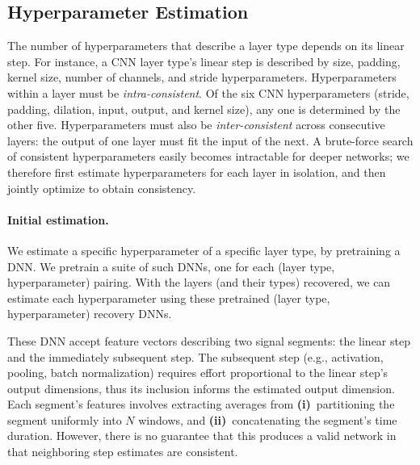 \documentclass[12pt]{report}
\newcommand{\Li}{\textbf{(i)}\ }
\newcommand{\Lii}{\textbf{(ii)}\ }
\begin{document}
\vspace{-2mm}
\subsection{Hyperparameter Estimation}\label{sec:hyper}

The number of hyperparameters that 
describe a layer type depends 
on its linear step. For instance, a CNN layer type's linear
step is described by
size, padding, kernel size, number of channels, and stride hyperparameters.
Hyperparameters within a layer must be \emph{intra-consistent}. Of the six CNN 
hyperparameters (stride, padding, dilation, input, output, and kernel size),
any one is determined by the other five.
Hyperparameters must also be \emph{inter-consistent} across consecutive layers:
the output of one layer must fit the input of the next.
A brute-force search of consistent hyperparameters easily becomes
intractable for deeper networks; we therefore first estimate
hyperparameters for each layer in isolation, 
and then jointly optimize to obtain consistency.

\vspace{-2mm}
\paragraph{Initial estimation.}
We estimate a specific hyperparameter of a specific layer type,
by pretraining a DNN. We pretrain a suite of such DNNs, 
one for each (layer type, hyperparameter) pairing. 
With the layers (and their types) recovered, we can
estimate each hyperparameter using these
pretrained (layer type, hyperparameter) recovery DNNs. 

These DNN accept feature vectors describing two signal
segments: the linear step and the immediately subsequent step.
The subsequent step (e.g., activation, pooling, batch
normalization) requires effort proportional to the linear step's 
output dimensions, thus its inclusion informs the estimated output dimension. 
Each segment's features involves extracting averages from
\Li partitioning the segment uniformly into $N$ windows, and
\Lii concatenating the segment's time duration.
However, there is no guarantee that this produces a valid network 
in that neighboring step estimates are consistent.

\vspace{-2mm}
\end{document}
